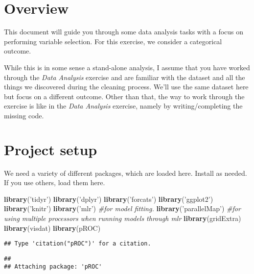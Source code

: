 \documentclass[]{article}
\title{}
\author{}
\date{}
\newenvironment{Shaded}{\begin{snugshade}}{\end{snugshade}}
\newcommand{\CommentTok}[1]{\textcolor[rgb]{0.56,0.35,0.01}{\textit{#1}}}
\newcommand{\KeywordTok}[1]{\textcolor[rgb]{0.13,0.29,0.53}{\textbf{#1}}}
\newcommand{\NormalTok}[1]{#1}
\newcommand{\StringTok}[1]{\textcolor[rgb]{0.31,0.60,0.02}{#1}}
\begin{document}
\hypertarget{overview}{%
\section{Overview}\label{overview}}

This document will guide you through some data analysis tasks with a
focus on performing variable selection. For this exercise, we consider a
categorical outcome.

While this is in some sense a stand-alone analysis, I assume that you
have worked through the \emph{Data Analysis} exercise and are familiar
with the dataset and all the things we discovered during the cleaning
process. We'll use the same dataset here but focus on a different
outcome. Other than that, the way to work through the exercise is like
in the \emph{Data Analysis} exercise, namely by writing/completing the
missing code.

\hypertarget{project-setup}{%
\section{Project setup}\label{project-setup}}

We need a variety of different packages, which are loaded here. Install
as needed. If you use others, load them here.

\begin{Shaded}
\begin{Highlighting}[]
\KeywordTok{library}\NormalTok{(}\StringTok{'tidyr'}\NormalTok{)}
\KeywordTok{library}\NormalTok{(}\StringTok{'dplyr'}\NormalTok{)}
\KeywordTok{library}\NormalTok{(}\StringTok{'forcats'}\NormalTok{)}
\KeywordTok{library}\NormalTok{(}\StringTok{'ggplot2'}\NormalTok{)}
\KeywordTok{library}\NormalTok{(}\StringTok{'knitr'}\NormalTok{)}
\KeywordTok{library}\NormalTok{(}\StringTok{'mlr'}\NormalTok{) }\CommentTok{#for model fitting.}
\KeywordTok{library}\NormalTok{(}\StringTok{'parallelMap'}\NormalTok{) }\CommentTok{#for using multiple processors when running models through mlr}
\KeywordTok{library}\NormalTok{(gridExtra)}
\KeywordTok{library}\NormalTok{(visdat)}
\KeywordTok{library}\NormalTok{(pROC)}
\end{Highlighting}
\end{Shaded}

\begin{verbatim}
## Type 'citation("pROC")' for a citation.
\end{verbatim}

\begin{verbatim}
## 
## Attaching package: 'pROC'
\end{verbatim}
\end{document}
